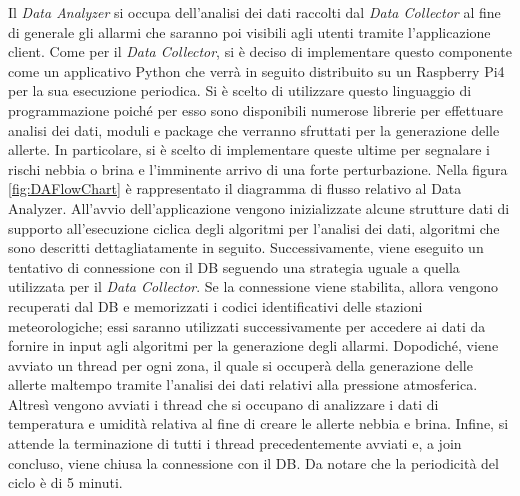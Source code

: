 Il \textit{Data Analyzer} si occupa dell'analisi dei dati raccolti dal \textit{Data Collector} al fine di generale gli allarmi che saranno poi visibili agli utenti tramite l'applicazione client. Come per il \textit{Data Collector}, si è deciso di implementare questo componente come un applicativo Python che verrà in seguito distribuito su un Raspberry Pi4 per la sua esecuzione periodica. Si è scelto di utilizzare questo linguaggio di programmazione poiché per esso sono disponibili numerose librerie per effettuare analisi dei dati, moduli e package che verranno sfruttati per la generazione delle allerte. In particolare, si è scelto di implementare queste ultime per segnalare i rischi nebbia o brina e l'imminente arrivo di una forte perturbazione. Nella figura \ref{fig:DAFlowChart} è rappresentato il diagramma di flusso relativo al Data Analyzer. All'avvio dell'applicazione vengono inizializzate alcune strutture dati di supporto all'esecuzione ciclica degli algoritmi per l'analisi dei dati, algoritmi che sono descritti dettagliatamente in seguito. Successivamente, viene eseguito un tentativo di connessione con il DB seguendo una strategia uguale a quella utilizzata per il \textit{Data Collector}. Se la connessione viene stabilita, allora vengono recuperati dal DB e memorizzati i codici identificativi delle stazioni meteorologiche; essi saranno utilizzati successivamente per accedere ai dati da fornire in input agli algoritmi per la generazione degli allarmi. Dopodiché, viene avviato un thread per ogni zona, il quale si occuperà della generazione delle allerte maltempo tramite l'analisi dei dati relativi alla pressione atmosferica. Altresì vengono avviati i thread che si occupano di analizzare i dati di temperatura e umidità relativa al fine di creare le allerte nebbia e brina. Infine, si attende la terminazione di tutti i thread precedentemente avviati e, a join concluso, viene chiusa la connessione con il DB. Da notare che la periodicità del ciclo è di 5 minuti.

